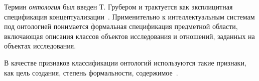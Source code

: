 



\newpage
Термин \textit{онтология} был введен Т. Грубером и трактуется как эксплицитная спецификация концептуализации~\cite{Gruber1995}. Применительно к интеллектуальным системам под онтологией понимается формальная спецификация предметной области, включающая описания классов объектов исследования и отношений, заданных на объектах исследования. 

В качестве признаков классификации онтологий используются такие признаки, как цель создания, степень формальности, содержимое~\cite{Dobrov2006}. 

